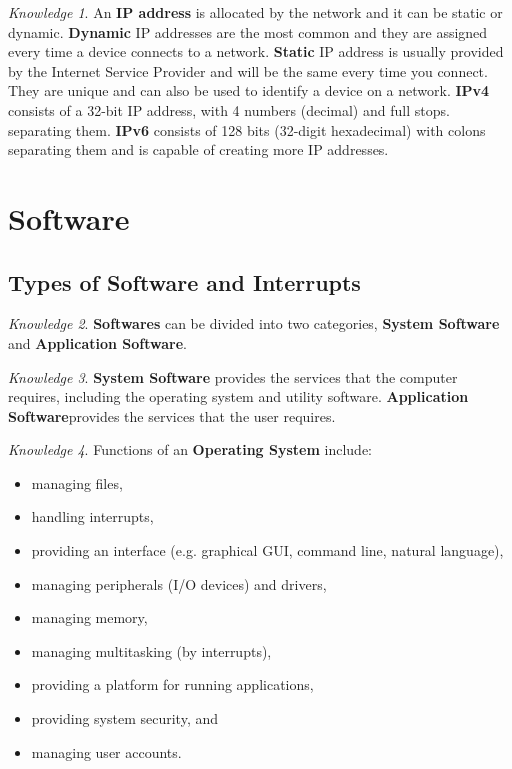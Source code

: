 \documentclass[8pt]{article}
\theoremstyle{remark}
\newtheorem{knowledge}{Knowledge}[subsection]
\begin{document}
            \begin{knowledge}
                An \textbf{IP address} is allocated by the network and it can be static or dynamic. \textbf{Dynamic} IP addresses are the most common and they are assigned every time a device connects to a network. \textbf{Static} IP address is usually provided by the Internet Service Provider and will be the same every time you connect. They are unique and can also be used to identify a device on a network. \textbf{IPv4} consists of a 32-bit IP address, with 4 numbers (decimal) and full stops. separating them. \textbf{IPv6} consists of 128 bits (32-digit hexadecimal) with colons separating them and is capable of creating more IP addresses.
            \end{knowledge}
    
    \section{Software}

        \subsection{Types of Software and Interrupts}
            \begin{knowledge}
                \textbf{Softwares} can be divided into two categories, \textbf{System Software} and \textbf{Application Software}.
            \end{knowledge}

            \begin{knowledge}
                \textbf{System Software} provides the services that the computer requires, including the operating system and utility software. \textbf{Application Software}provides the services that the user requires.
            \end{knowledge}

            \begin{knowledge}
                Functions of an \textbf{Operating System} include:
                \begin{itemize}
                    \item managing files,
                    \item handling interrupts,
                    \item providing an interface (e.g. graphical GUI, command line, natural language),
                    \item managing peripherals (I/O devices) and drivers,
                    \item managing memory,
                    \item managing multitasking (by interrupts),
                    \item providing a platform for running applications,
                    \item providing system security, and
                    \item managing user accounts.
                \end{itemize}
            \end{knowledge}
\end{document}
